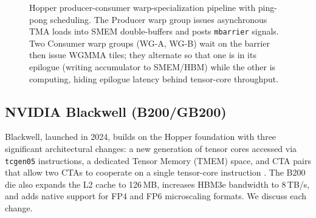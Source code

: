 \documentclass[10pt]{article}
\begin{document}
\begin{figure}[t]
\caption{Hopper producer-consumer warp-specialization pipeline with ping-pong scheduling. The Producer warp group issues asynchronous TMA loads into SMEM double-buffers and posts \texttt{mbarrier} signals. Two Consumer warp groups (WG-A, WG-B) wait on the barrier then issue WGMMA tiles; they alternate so that one is in its epilogue (writing accumulator to SMEM/HBM) while the other is computing, hiding epilogue latency behind tensor-core throughput.}
\label{fig:warp-spec}
\end{figure}

\subsection{NVIDIA Blackwell (B200/GB200)}
\label{sec:hw-blackwell}

Blackwell, launched in 2024, builds on the Hopper foundation with three significant architectural changes: a new generation of tensor cores accessed via \texttt{tcgen05} instructions, a dedicated Tensor Memory (TMEM) space, and CTA pairs that allow two CTAs to cooperate on a single tensor-core instruction \citep{nvidia2024blackwell}. The B200 die also expands the L2 cache to 126\,MB, increases HBM3e bandwidth to 8\,TB/s, and adds native support for FP4 and FP6 microscaling formats. We discuss each change.
\end{document}
